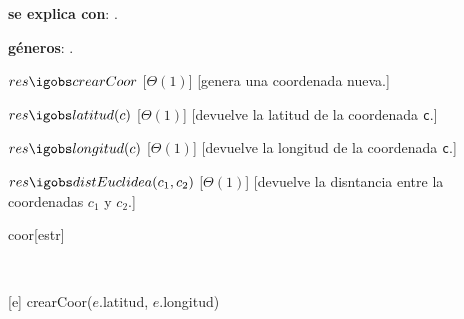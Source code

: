 \begin{Interfaz}


  \textbf{se explica con}: .

  \textbf{g\'eneros}: .



  {$res \igobs crearCoor$}%
  [$\Theta(1)$]
  [genera una coordenada nueva.]


  {$res \igobs latitud(c)$}
  [$\Theta(1)$]
  [devuelve la latitud de la coordenada \texttt{c}.]

  {$res \igobs longitud(c)$}
  [$\Theta(1)$]
  [devuelve la longitud de la coordenada \texttt{c}.]


  {$res \igobs distEuclidea(c_1, c_2)$}%
  [$\Theta(1)$]
  [devuelve la disntancia entre la coordenadas \texttt{$c_1$} y \texttt{$c_2$}.]


\end{Interfaz}

\begin{Representacion}
 
  \begin{Estructura}{coor}[estr]
      \begin{Tupla}[estr]%
    \end{Tupla}
  \end{Estructura}


  ~

  [e]{ crearCoor($e$.latitud, $e$.longitud)}

\end{Representacion}

